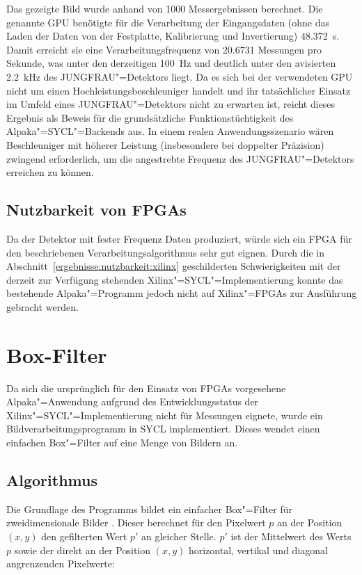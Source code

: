 Das gezeigte Bild wurde anhand von \num{1000} Messergebnissen berechnet. Die
genannte GPU benötigte für die Verarbeitung der Eingangsdaten (ohne das Laden
der Daten von der Festplatte, Kalibrierung und Invertierung)
\SI{48.372}{\second}. Damit erreicht sie eine Verarbeitungsfrequenz von
\num{20.6731} Messungen pro Sekunde, was unter den derzeitigen \SI{100}{\hertz}
und deutlich unter den avisierten \SI{2.2}{\kilo\hertz} des JUNGFRAU"=Detektors
liegt. Da es sich bei der verwendeten GPU nicht um einen
Hochleistungsbeschleuniger handelt und ihr tatsächlicher Einsatz im Umfeld eines
JUNGFRAU"=Detektors nicht zu erwarten ist, reicht dieses Ergebnis als Beweis
für die grundsätzliche Funktionstüchtigkeit des Alpaka"=SYCL"=Backends aus. In
einem realen Anwendungsszenario wären Beschleuniger mit höherer Leistung
(insbesondere bei doppelter Präzision) zwingend erforderlich, um die angestrebte
Frequenz des JUNGFRAU"=Detektors erreichen zu können.

\subsection{Nutzbarkeit von FPGAs}

Da der Detektor mit fester Frequenz Daten produziert, würde sich ein FPGA für
den beschriebenen Verarbeitungsalgorithmus sehr gut eignen. Durch die in
Abschnitt~\ref{ergebnisse:nutzbarkeit:xilinx} geschilderten Schwierigkeiten
mit der derzeit zur Verfügung stehenden Xilinx"=SYCL"=Implementierung konnte 
das bestehende Alpaka"=Programm jedoch nicht auf Xilinx"=FPGAs zur Ausführung
gebracht werden.

\section{Box-Filter}
\label{ergebnisse:box}

Da sich die ursprünglich für den Einsatz von FPGAs vorgesehene Alpaka"=Anwendung
aufgrund des Entwicklungsstatus der Xilinx"=SYCL"=Implementierung nicht für
Messungen eignete, wurde ein Bildverarbeitungsprogramm in SYCL implementiert.
Dieses wendet einen einfachen Box"=Filter auf eine Menge von Bildern an.

\subsection{Algorithmus}

Die Grundlage des Programms bildet ein einfacher Box"=Filter für
zweidimensionale Bilder \cite[vgl.][]{nakamura2017}. Dieser berechnet für den
Pixelwert $p$ an der Position $(x, y)$ den gefilterten Wert $p'$ an gleicher
Stelle. $p'$ ist der Mittelwert des Werts $p$ sowie der direkt an der Position
$(x, y)$ horizontal, vertikal und diagonal angrenzenden Pixelwerte:

